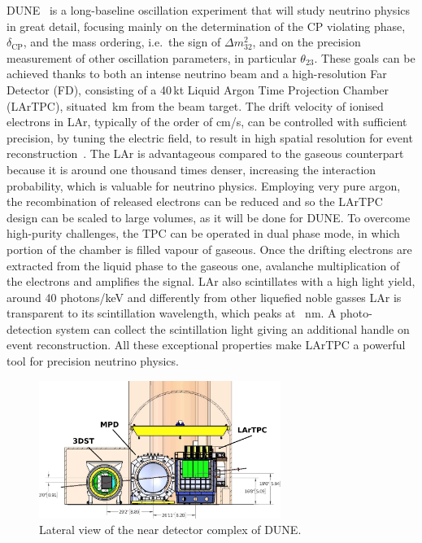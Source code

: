 DUNE~\cite{Abi:2018dnh} is a long-baseline oscillation experiment that %
will study neutrino physics in great detail, focusing mainly on the determination %
of the CP violating phase, $\delta_\text{CP}$, and the mass ordering, i.e.\ the sign of $\Delta m_{32}^2$, %
and on the precision measurement of other oscillation parameters, in particular $\theta_{23}$.
These goals can be achieved thanks to both an intense neutrino beam and a high-resolution Far Detector (FD), %
consisting of a 40\,kt Liquid Argon Time Projection Chamber (LArTPC), situated \,km from the beam target.
The drift velocity of ionised electrons in LAr, typically of the order of cm/\textmu s, %
can be controlled with sufficient precision, by tuning the electric field, %
to result in high spatial resolution for event reconstruction~\cite{Rubbia:1977zz}.
The LAr is advantageous compared to the gaseous counterpart because it is around one thousand times denser, %
increasing the interaction probability, which is valuable for neutrino physics.
Employing very pure argon, the recombination of released electrons can be reduced and %
so the LArTPC design can be scaled to large volumes, as it will be done for DUNE.
To overcome high-purity challenges, the TPC can be operated in dual phase mode, in which portion of the chamber is filled %
vapour of gaseous.
Once the drifting electrons are extracted from the liquid phase to the gaseous one, avalanche multiplication %
of the electrons and amplifies the signal.
LAr also scintillates with a high light yield, around 40 photons/keV and differently from other %
liquefied noble gasses LAr is transparent to its scintillation wavelength, which peaks at ~nm.
A photo-detection system can collect the scintillation light giving an additional handle on event reconstruction.
All these exceptional properties make LArTPC a powerful tool for precision neutrino physics.

\begin{figure}
	\centering
	\includegraphics[width=0.7\textwidth]{pics/duneND.png}
	\caption[View of the near detector complex of DUNE]%
	{Lateral view of the near detector complex of DUNE.}
	\label{fig:duneND}
\end{figure}

